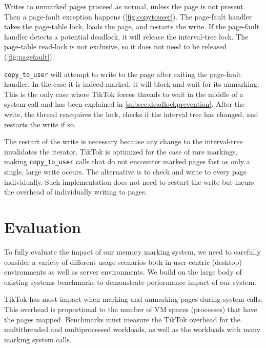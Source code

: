 \documentclass[conference]{IEEEtran}
\newcommand{\sysname}{TikTok}
\begin{document}
Writes to unmarked pages proceed as normal, unless the page is not present. Then
a page-fault exception happens (\autoref{fig:copytouser}). The page-fault
handler takes the page-table lock, loads the page, and restarts the write. If the
page-fault handler detects a potential deadlock, it will release the
interval-tree lock. The page-table read-lock is not exclusive, so it does not need
to be released (\autoref{fig:pagefault}).

\texttt{copy\_to\_user} will attempt to write to the page after exiting the
page-fault handler. In the case it is indeed marked, it will block and wait for
its unmarking. This is the only case where \sysname{} forces threads to wait in
the middle of a system call and has been explained in
\autoref{subsec:deadlockprevention}. After the write, the thread reacquires the
lock, checks if the interval tree has changed, and restarts the write if so.

The restart of the write is necessary because any change to the interval-tree
invalidates the iterator. \sysname{} is optimized for the case of rare markings,
making \texttt{copy\_to\_user} calls that do not encounter marked pages fast as
only a single, large write occurs. The alternative is to check and write to every
page individually. Such implementation does not need to restart the write but
incurs the overhead of individually writing to pages.


\section{Evaluation} \label{sec:evaluation}


To fully evaluate the impact of our memory marking system, we need to carefully
consider a variety of different usage scenarios both in user-centric (desktop)
environments as well as server environments. We build on the large body of
existing systems benchmarks to demonstrate performance impact of our system.

\sysname{} has most impact when marking and unmarking pages during
system calls. This overhead is proportional to the number of VM spaces
(processes) that have the pages mapped. Benchmarks must measure the \sysname{}
overhead for the multithreaded and multiprocessed workloads, as well as the
workloads with many marking system calls.
\end{document}
